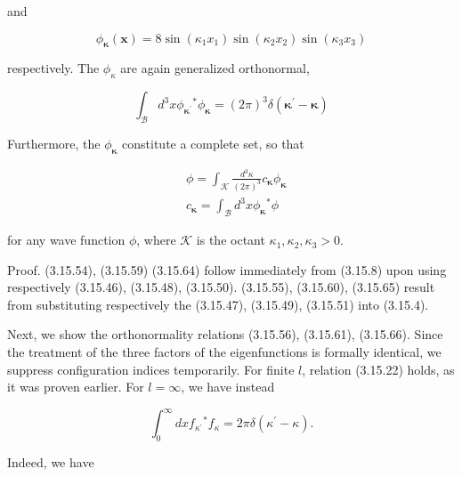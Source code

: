 \documentclass{article}
\begin{document}
and
 
\begin{equation*}
\phi_{\boldsymbol{\kappa}}(\boldsymbol{x})=8 \sin \left(\kappa_{1} x_{1}\right) \sin \left(\kappa_{2} x_{2}\right) \sin \left(\kappa_{3} x_{3}\right) \tag{3.15.65}
\end{equation*}
 
respectively. The $\phi_{\kappa}$ are again generalized orthonormal,
 
\begin{equation*}
\int_{\mathcal{B}} d^{3} x \phi_{\boldsymbol{\kappa}^{\prime}}{ }^{*} \phi_{\boldsymbol{\kappa}}=(2 \pi)^{3} \delta\left(\boldsymbol{\kappa}^{\prime}-\boldsymbol{\kappa}\right) \tag{3.15.66}
\end{equation*}
 

Furthermore, the $\phi_{\boldsymbol{\kappa}}$ constitute a complete set, so that
 
\begin{align*}
& \phi=\int_{\mathcal{K}} \frac{d^{3} \kappa}{(2 \pi)^{3}} c_{\boldsymbol{\kappa}} \phi_{\boldsymbol{\kappa}}  \tag{3.15.67}\\
& c_{\boldsymbol{\kappa}}=\int_{\mathcal{B}} d^{3} x \phi_{\boldsymbol{\kappa}}{ }^{*} \phi \tag{3.15.68}
\end{align*}
 
for any wave function $\phi$, where $\mathcal{K}$ is the octant $\kappa_{1}, \kappa_{2}, \kappa_{3}>0$.

Proof. (3.15.54), (3.15.59) (3.15.64) follow immediately from (3.15.8) upon using respectively (3.15.46), (3.15.48), (3.15.50). (3.15.55), (3.15.60), (3.15.65) result from substituting respectively the (3.15.47), (3.15.49), (3.15.51) into (3.15.4).

Next, we show the orthonormality relations (3.15.56), (3.15.61), (3.15.66). Since the treatment of the three factors of the eigenfunctions is formally identical, we suppress configuration indices temporarily. For finite $l$, relation (3.15.22) holds, as it was proven earlier. For $l=\infty$, we have instead
 
\begin{equation*}
\int_{0}^{\infty} d x f_{\kappa^{\prime}}{ }^{*} f_{\kappa}=2 \pi \delta\left(\kappa^{\prime}-\kappa\right) . \tag{3.15.69}
\end{equation*}
 

Indeed, we have
 
\end{document}
